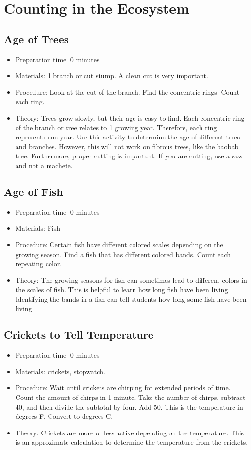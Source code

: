 \section{Counting in the Ecosystem}


\subsection{Age of Trees}
\begin{itemize}
\item{Preparation time: 0 minutes}
\item{Materials: 1 branch or cut stump. A clean cut is very important.}
\item{Procedure: Look at the cut of the branch. Find the concentric rings. Count each ring.}
\item{Theory: Trees grow slowly, but their age is easy to find. Each concentric ring of the branch or tree relates to 1 growing year. Therefore, each ring represents one year. Use this activity to determine the age of different trees and branches. However, this will not work on fibrous trees, like the baobab tree. Furthermore, proper cutting is important. If you are cutting, use a saw and not a machete.}
\end{itemize}

\subsection{Age of Fish}
\begin{itemize}
\item{Preparation time: 0 minutes}
\item{Materials: Fish}
\item{Procedure: Certain fish have different colored scales depending on the growing season. Find a fish that has different colored bands. Count each repeating color.}
\item{Theory: The growing seasons for fish can sometimes lead to different colors in the scales of fish. This is helpful to learn how long fish have been living. Identifying the bands in a fish can tell students how long some fish have been living.}
\end{itemize}

\subsection{Crickets to Tell Temperature}
\begin{itemize}
\item{Preparation time: 0 minutes}
\item{Materials: crickets, stopwatch.}
\item{Procedure: Wait until crickets are chirping for extended periods of time. Count the amount of chirps in 1 minute. Take the number of chirps, subtract 40, and then divide the subtotal by four. Add 50. This is the temperature in degrees F. Convert to degrees C.}
\item{Theory:  Crickets are more or less active depending on the temperature. This is an approximate calculation to determine the temperature from the crickets.}
\end{itemize}

